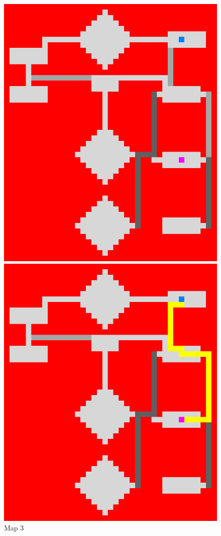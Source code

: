 \documentclass{article}
\begin{document}
\begin{figure}[h]
	\centering
	\begin{minipage}{0.4\textwidth}
		\includegraphics[width=\textwidth]{images/map3}
    		\caption{Map 3}
	\end{minipage}
	\hfill
	\begin{minipage}{0.4\textwidth}
		\includegraphics[width=\textwidth]{images/map3_solution}

\end{minipage}
\end{figure}
\end{document}

